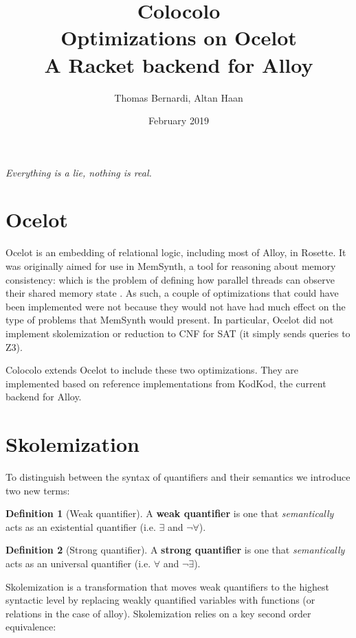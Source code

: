 \documentclass[10pt]{article}
\title{Colocolo\\\large Optimizations on Ocelot \\ A Racket backend for Alloy}
\date{February 2019}
\author{Thomas Bernardi, Altan Haan}
\theoremstyle{definition}
\newtheorem{definition}{Definition}[section]
\begin{document}
	\maketitle
	\begin{center}	
		\textit{Everything is a lie, nothing is real.} \\
  \end{center}

  \section{Ocelot}

  Ocelot is an embedding of relational logic, including most of Alloy, in Rosette. It was originally aimed for use in MemSynth, a tool for reasoning about memory consistency: which is the problem of defining how parallel threads can observe their shared memory state \cite{bornholdt17}. As such, a couple of optimizations that could have been implemented were not because they would not have had much effect on the type of problems that MemSynth would present. In particular, Ocelot did not implement skolemization or reduction to CNF for SAT (it simply sends queries to Z3).

  Colocolo extends Ocelot to include these two optimizations. They are implemented based on reference implementations from KodKod, the current backend for Alloy.

  \section{Skolemization}

  To distinguish between the syntax of quantifiers and their semantics we introduce two new terms:\\
  \theoremstyle{definition}
  \begin{definition}[Weak quantifier]
      A \textbf{weak quantifier} is one that \emph{semantically} acts as an existential quantifier (i.e. $\exists$ and $\neg \forall$).
  \end{definition}

  \begin{definition}[Strong quantifier]
      A \textbf{strong quantifier} is one that \emph{semantically} acts as an universal quantifier (i.e. $\forall$ and $\neg \exists$).
  \end{definition}

  Skolemization is a transformation that moves weak quantifiers to the highest syntactic level by replacing weakly quantified variables with functions (or relations in the case of alloy). Skolemization relies on a key second order equivalence:
\end{document}
